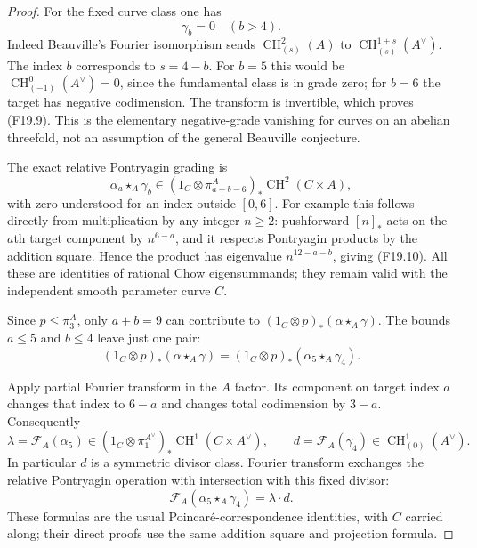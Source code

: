 \documentclass[11pt]{article}
\theoremstyle{remark}\newtheorem{remark}[theorem]{Remark}
\begin{document}
\begin{proof}
For the fixed curve class one has
\[
                         \gamma_b=0\quad(b>4).
 \tag{F19.9}
\]
Indeed Beauville's Fourier isomorphism sends
$\operatorname{CH}^2_{(s)}(A)$ to
$\operatorname{CH}^{1+s}_{(s)}(A^\vee)$.
The index $b$ corresponds to $s=4-b$.  For $b=5$ this
would be $\operatorname{CH}^0_{(-1)}(A^\vee)=0$, since
the fundamental class is in grade zero; for $b=6$ the
target has negative codimension.  The transform is
invertible, which proves (F19.9).  This is the elementary
negative-grade vanishing for curves on an abelian
threefold, not an assumption of the general Beauville
conjecture.

The exact relative Pontryagin grading is
\[
       \alpha_a\star_A\gamma_b
        \in(1_C\otimes\pi_{a+b-6}^A)_*
                         \operatorname{CH}^2(C\times A),
 \tag{F19.10}
\]
with zero understood for an index outside $[0,6]$.
For example this follows directly from multiplication by
any integer $n\ge2$: pushforward $[n]_*$ acts on the
$a$th target component by $n^{6-a}$, and it respects
Pontryagin products by the addition square.  Hence the
product has eigenvalue $n^{12-a-b}$, giving (F19.10).
All these are identities of rational Chow eigensummands;
they remain valid with the independent smooth parameter
curve $C$.

Since $p\le\pi_3^A$, only $a+b=9$ can contribute to
$(1_C\otimes p)_*(\alpha\star_A\gamma)$.
The bounds $a\le5$ and $b\le4$ leave just one pair:
\[
 (1_C\otimes p)_*(\alpha\star_A\gamma)
                =(1_C\otimes p)_*(\alpha_5\star_A\gamma_4).
 \tag{F19.11}
\]

Apply partial Fourier transform in the $A$ factor.  Its
component on target index $a$ changes that index to $6-a$
and changes total codimension by $3-a$.  Consequently
\[
 \lambda=\mathcal F_A(\alpha_5)
      \in(1_C\otimes\pi_1^{A^\vee})_*
                              \operatorname{CH}^1(C\times A^\vee),
 \qquad
 d=\mathcal F_A(\gamma_4)
                              \in\operatorname{CH}^1_{(0)}(A^\vee).
 \tag{F19.12}
\]
In particular $d$ is a symmetric divisor class.  Fourier
transform exchanges the relative Pontryagin operation
with intersection with this fixed divisor:
\[
                 \mathcal F_A(\alpha_5\star_A\gamma_4)
                                      =\lambda\cdot d.
 \tag{F19.13}
\]
These formulas are the usual Poincar\'e-correspondence
identities, with $C$ carried along; their direct proofs
use the same addition square and projection formula.


\end{proof}
\end{document}
